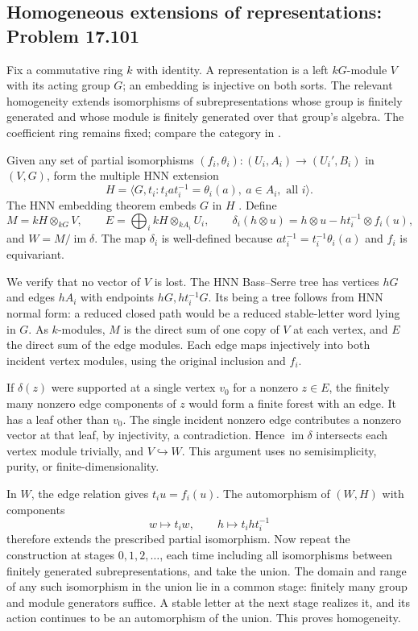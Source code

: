 \subsection{Homogeneous extensions of representations: Problem 17.101}
\label{cand:17.101}

Fix a commutative ring \(k\) with identity. A representation
is a left \(kG\)-module \(V\) with its acting group \(G\);
an embedding is injective on both sorts. The relevant
homogeneity extends isomorphisms of subrepresentations
whose group is finitely generated and whose module is
finitely generated over that group's algebra. The coefficient
ring remains fixed; compare the category in \cite{gvaramia-plotkin}.

Given any set of partial isomorphisms
\((f_i,\theta_i):(U_i,A_i)\to(U_i',B_i)\) in \((V,G)\),
form the multiple HNN extension
\[
 H=\langle G,t_i:t_iat_i^{-1}=\theta_i(a),\
                         a\in A_i,\text{ all }i\rangle.
\]
The HNN embedding theorem embeds \(G\) in \(H\)
\cite{hnn}. Define
\[
 M=kH\otimes_{kG}V,\qquad
 E=\bigoplus_i kH\otimes_{kA_i}U_i,\qquad
 \delta_i(h\otimes u)=h\otimes u-ht_i^{-1}\otimes f_i(u),
\]
and \(W=M/\operatorname{im}\delta\).
The map \(\delta_i\) is well-defined because
\(at_i^{-1}=t_i^{-1}\theta_i(a)\) and \(f_i\) is equivariant.

We verify that no vector of \(V\) is lost. The HNN
Bass--Serre tree has vertices \(hG\) and edges \(hA_i\)
with endpoints \(hG,ht_i^{-1}G\). Its being a tree follows
from HNN normal form: a reduced closed path would be a
reduced stable-letter word lying in \(G\). As \(k\)-modules,
\(M\) is the direct sum of one copy of \(V\) at each
vertex, and \(E\) the direct sum of the edge modules.
Each edge maps injectively into both incident vertex
modules, using the original inclusion and \(f_i\).

If \(\delta(z)\) were supported at a single vertex \(v_0\)
for a nonzero \(z\in E\), the finitely many nonzero edge
components of \(z\) would form a finite forest with an edge.
It has a leaf other than \(v_0\). The single incident
nonzero edge contributes a nonzero vector at that leaf,
by injectivity, a contradiction. Hence
\(\operatorname{im}\delta\) intersects each vertex module
trivially, and \(V\hookrightarrow W\).
This argument uses no semisimplicity, purity, or
finite-dimensionality.

In \(W\), the edge relation gives \(t_i u=f_i(u)\).
The automorphism of \((W,H)\) with components
\[
 w\mapsto t_iw,\qquad h\mapsto t_iht_i^{-1}
\]
therefore extends the prescribed partial isomorphism.
Now repeat the construction at stages \(0,1,2,\ldots\),
each time including all isomorphisms between finitely
generated subrepresentations, and take the union.
The domain and range of any such isomorphism in the
union lie in a common stage: finitely many group and
module generators suffice. A stable letter at the next
stage realizes it, and its action continues to be an
automorphism of the union. This proves homogeneity.

